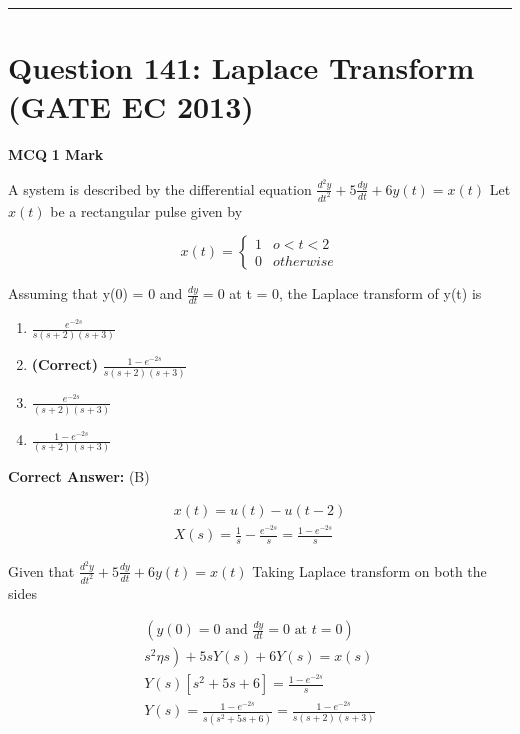 \documentclass[11pt,a4paper]{article}
\begin{document}
\vspace{1.5em}
\hrule
\vspace{1.5em}

\section*{Question 141: Laplace Transform (GATE EC 2013)}
\noindent \textbf{\color{primary}MCQ} \hfill \textbf{\color{secondary}1 Mark}


\noindent A system is described by the differential equation $\frac{d^{2}y}{dt^{2}}+5\frac{dy}{dt}+6y (t)=x(t)$ 
 Let $x(t )$ be a rectangular pulse given by 
 
\[
x(t)=\left\{\begin{matrix} 1 & o < t < 2 \\ 0 & otherwise \end{matrix}\right.
\]

Assuming that y(0) = 0 and $\frac{dy}{dt}=0$ at t = 0, the Laplace transform of y(t) is


\begin{enumerate}[label=(\Alph*)]
    \item $\frac{e^{-2s}}{s\left ( s+2 \right )\left ( s+3 \right )}$
    \item \textbf{(Correct)} $\frac{1-e^{-2s}}{s\left ( s+2 \right )\left ( s+3 \right )}$
    \item $\frac{e^{-2s}}{\left ( s+2 \right )\left ( s+3 \right )}$
    \item $\frac{1-e^{-2s}}{\left ( s+2 \right )\left ( s+3 \right )}$
\end{enumerate}

\noindent \textbf{Correct Answer:} (B)

\begin{tcolorbox}[solbox, title=Detailed Solution -- Question 141]
\[
\begin{array}{l} x(t)=u(t)-u(t-2) \\ X(s)=\frac{1}{s}-\frac{e^{-2 s}}{s}=\frac{1-e^{-2 s}}{s} \end{array}
\]

Given that
$\frac{d^{2} y}{d t^{2}}+5 \frac{d y}{d t}+6 y(t)=x(t)$
 Taking Laplace transform on both the sides

\[
\begin{array}{l} \left(y(0)=0 \text { and } \frac{d y}{d t}=0 \text { at } t=0\right)\\ \left.s^{2} \eta s\right)+5 s Y(s)+6 Y(s)=x(s) \\ Y(s)\left[s^{2}+5 s+6\right]=\frac{1-e^{-2 s}}{s}\\ Y(s)=\frac{1-e^{-2 s}}{s\left(s^{2}+5 s+6\right)}=\frac{1-e^{-2 s}}{s(s+2)(s+3)} \end{array}
\]
\end{tcolorbox}
\end{document}

